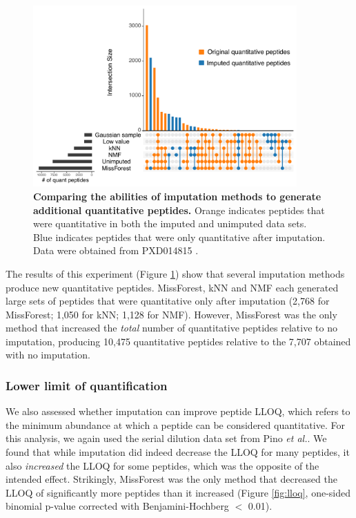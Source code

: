 \documentclass{article}
\begin{document}
\begin{figure}[t]
  \centering
  \includegraphics[width=0.9\textwidth]{figures/n-quant-peptides-figure.pdf}
  \caption{{\bf Comparing the abilities of imputation methods to generate additional quantitative peptides.} Orange indicates peptides that were quantitative in both the imputed and unimputed data sets. Blue indicates peptides that were only quantitative after imputation. Data were obtained from PXD014815 \cite{matrix-matched-calib}.}
  \label{fig:rescue-experiment}
\end{figure}

The results of this experiment (Figure \ref{fig:rescue-experiment}) show that several imputation methods produce new quantitative peptides. MissForest, kNN and NMF each generated large sets of peptides that were quantitative only after imputation (2,768 for MissForest; 1,050 for kNN; 1,128 for NMF). However, MissForest was the only method that increased the \textit{total} number of quantitative peptides relative to no imputation, producing 10,475 quantitative peptides relative to the 7,707 obtained with no imputation. 

\subsubsection{Lower limit of quantification}

We also assessed whether imputation can improve peptide LLOQ, which refers to the minimum abundance at which a peptide can be considered quantitative. For this analysis, we again used the serial dilution data set from Pino \textit{et al.}. We found that while imputation did indeed decrease the LLOQ for many peptides, it also \textit{increased} the LLOQ for some peptides, which was the opposite of the intended effect. Strikingly, MissForest was the only method that decreased the LLOQ of significantly more peptides than it increased (Figure \ref{fig:lloq}, one-sided binomial p-value corrected with Benjamini-Hochberg $<$ 0.01).
\end{document}
